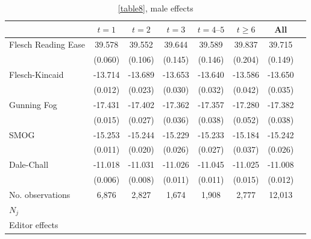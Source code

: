 \begin{table}[H]
    \footnotesize
    \centering
    \begin{threeparttable}
        \caption{\autoref{table8}, male effects}
        \label{tableC7}
        \begin{tabular}{p{3cm}S@{}S@{}S@{}S@{}S@{}S@{}S@{}}
            \toprule
            &{\(t=1\)}&{\(t=2\)}&{\(t=3\)}&{\(t=4\text{--}5\)}&{\(t\ge6\)}&{All}\\
            \midrule
            Flesch Reading Ease           &      39.578&      39.552&      39.644&      39.589&      39.837&      39.715\\
                                          &     (0.060)&     (0.106)&     (0.145)&     (0.146)&     (0.204)&     (0.149)\\
            Flesch-Kincaid                &     -13.714&     -13.689&     -13.653&     -13.640&     -13.586&     -13.650\\
                                          &     (0.012)&     (0.023)&     (0.030)&     (0.032)&     (0.042)&     (0.035)\\
            Gunning Fog                   &     -17.431&     -17.402&     -17.362&     -17.357&     -17.280&     -17.382\\
                                          &     (0.015)&     (0.027)&     (0.036)&     (0.038)&     (0.052)&     (0.038)\\
            SMOG                          &     -15.253&     -15.244&     -15.229&     -15.233&     -15.184&     -15.242\\
                                          &     (0.011)&     (0.020)&     (0.026)&     (0.027)&     (0.037)&     (0.026)\\
            Dale-Chall                    &     -11.018&     -11.031&     -11.026&     -11.045&     -11.025&     -11.008\\
                                          &     (0.006)&     (0.008)&     (0.011)&     (0.011)&     (0.015)&     (0.012)\\
            \midrule
            No. observations              &       6,876&       2,827&       1,674&       1,908&       2,777&      12,013\\
            \(N_j\)                       &           {}&           {}&           {}&           {}&           {}&           {}\\
            Editor effects                &           {}&           {}&           {}&           {}&           {}&           {}\\

\end{tabular}
\end{threeparttable}
\end{table}
